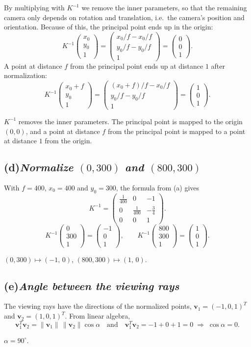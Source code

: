 \documentclass[11pt,a4paper]{article}
\newcommand{\vb}[1]{\mathbf{#1}}
\newcommand{\vect}[1]{
    \begin{pmatrix}#1
\end{pmatrix}}
\newcommand{\task}[2]{
\subsection*{#1\quad\normalfont\textit{#2}}}
\begin{document}
By multiplying with $K^{-1}$ we remove the inner parameters, so that
the remaining camera only
depends on rotation and translation, i.e.\ the camera's position and
orientation.
Because of this, the principal point ends up in the origin:
\[
    K^{-1}\vect{x_0\\y_0\\1} = \vect{x_0/f - x_0/f\\ y_0/f -
    y_0/f\\ 1} = \vect{0\\0\\1}.
\]
A point at distance $f$ from the principal point ends up at distance
$1$ after normalization:
\[
    K^{-1}\vect{x_0+f\\y_0\\1} = \vect{(x_0+f)/f - x_0/f\\ y_0/f -
    y_0/f\\ 1} = \vect{1\\0\\1}.
\]
\begin{answer}
    $K^{-1}$ removes the inner parameters. The principal point is
    mapped to the origin $(0,0)$, and
    a point at distance $f$ from the principal point is mapped to a
    point at distance $1$ from the origin.
\end{answer}

\task{(d)}{Normalize $(0,300)$ and $(800,300)$}

With $f = 400$, $x_0 = 400$ and $y_0 = 300$, the formula from (a) gives
\[
    K^{-1} =
    \vect{\tfrac{1}{400}&0&-1\\[2pt]0&\tfrac{1}{400}&-\tfrac{3}{4}\\[2pt]0&0&1}.
\]
\[
    K^{-1}\vect{0\\300\\1} = \vect{-1\\0\\1},\qquad
    K^{-1}\vect{800\\300\\1} = \vect{1\\0\\1}.
\]
\begin{answer}
    $(0,300) \mapsto (-1,\,0)$, \quad $(800,300) \mapsto (1,\,0)$.
\end{answer}

\task{(e)}{Angle between the viewing rays}

The viewing rays have the directions of the normalized points,
$\vb{v}_1 = (-1,0,1)^T$ and $\vb{v}_2 = (1,0,1)^T$. From linear algebra,
\[
    \vb{v}_1^T\vb{v}_2 = \|\vb{v}_1\|\,\|\vb{v}_2\|\cos\alpha
    \quad\text{and}\quad
    \vb{v}_1^T\vb{v}_2 = -1 + 0 + 1 = 0
    \;\Longrightarrow\; \cos\alpha = 0.
\]
\begin{answer}
    $\alpha = 90^\circ$.
\end{answer}
\end{document}
